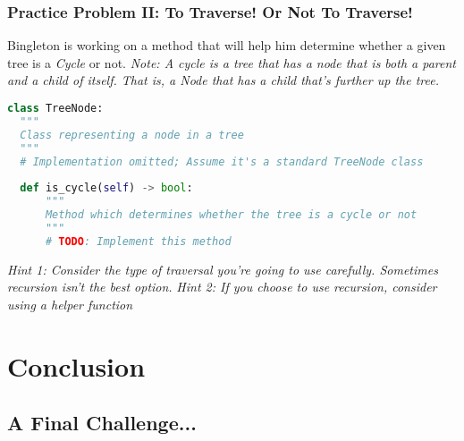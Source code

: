 \documentclass[hyperref={colorlinks,citecolor=blue,linkcolor=blue,urlcolor=blue}, aspectratio=1610]{beamer}
\begin{document}
\begin{frame}[fragile]
  \frametitle{Practice Problem II: To Traverse! Or Not To Traverse!}
  Bingleton is working on a method that will help him determine whether a given tree is a \textit{Cycle} or not.
  \textit{Note: A cycle is a tree that has a node that is both a parent and a child of itself. That is, a Node that has a child that's further up the tree.}

    \begin{lstlisting}[language=Python, style=mystyle]
class TreeNode:
  """
  Class representing a node in a tree
  """
  # Implementation omitted; Assume it's a standard TreeNode class
  
  def is_cycle(self) -> bool:
      """
      Method which determines whether the tree is a cycle or not
      """
      # TODO: Implement this method
    \end{lstlisting}

    \textit{Hint 1: Consider the type of traversal you're going to use carefully. Sometimes recursion isn't the best option.}
    \textit{Hint 2: If you choose to use recursion, consider using a helper function}

\end{frame}

\section{Conclusion}
\subsection{A Final Challenge...}
\end{document}
